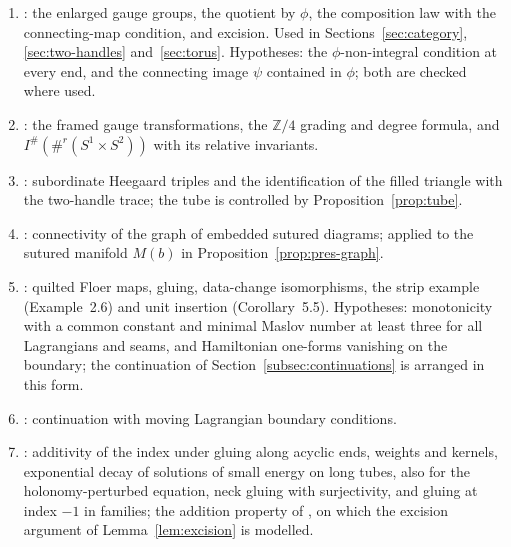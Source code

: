 \documentclass[11pt]{amsart}
\theoremstyle{definition}
\theoremstyle{remark}
\theoremstyle{plain}
\numberwithin{equation}{section}
\newcommand{\ZZ}{\mathbb{Z}}
\newcommand{\Ish}{I^{\#}}
\begin{document}
\begin{enumerate}[label=(\arabic*),leftmargin=2em]
  singularities for the mixed equation.
  Hypotheses: fixed product collars after conformal rescaling; the
  disconnected odd matching surface is allowed.
\item \cite[Sections~5.1--5.2, Definition~5.1, Propositions~5.2
  and~5.4, Theorem~5.6]{KM-unknot}: the enlarged gauge groups, the
  quotient by $\phi$, the composition law with the connecting-map
  condition, and excision. Used in Sections~\ref{sec:category},
  \ref{sec:two-handles} and~\ref{sec:torus}. Hypotheses: the
  $\phi$-non-integral condition at every end, and the connecting image
  $\psi$ contained in $\phi$; both are checked where used.
\item \cite[Sections~7.1--7.4, 7.6--7.8, Proposition~7.1]{Scaduto}: the
  framed gauge transformations, the $\ZZ/4$ grading and degree formula,
  and $\Ish(\#^r(S^1\times S^2))$ with its relative invariants.
\item \cite[Definition~4.2, Proposition~4.3, Lemma~4.5]{OS-triangles}:
  subordinate Heegaard triples and the identification of the filled
  triangle with the two-handle trace; the tube is controlled by
  Proposition~\ref{prop:tube}.
\item \cite[Definitions~2.34--2.35, Proposition~2.36]{JTZ}: connectivity of the
  graph of embedded sutured diagrams; applied to the sutured manifold
  $M(b)$ in Proposition~\ref{prop:pres-graph}.
\item \cite[Theorems~3.9, 3.13, 4.1, 4.2, Example~2.6 and Corollary~5.5]{WW-relative}:
  quilted Floer maps, gluing, data-change isomorphisms, the strip example
  (Example~2.6) and unit insertion (Corollary~5.5). Hypotheses: monotonicity with a common constant and minimal
  Maslov number at least three for all Lagrangians and seams, and
  Hamiltonian one-forms vanishing on the boundary; the continuation of
  Section~\ref{subsec:continuations} is arranged in this form.
\item \cite[Section~14.4]{Oh-book}: continuation with moving Lagrangian
  boundary conditions.
\item \cite[Propositions~3.8--3.10, 4.3, 4.4 and~4.16, Theorems~4.17 and~5.4,
  Sections~5.3 and~5.5]{Donaldson-book}: additivity of the index under gluing along
  acyclic ends, weights and kernels, exponential decay of solutions of small energy
  on long tubes, also for the holonomy-perturbed equation, neck gluing with
  surjectivity, and gluing at index $-1$ in families;
  the addition property of \cite[Section~3.3]{Donaldson-book}, on which the excision argument of Lemma~\ref{lem:excision} is modelled.

\end{enumerate}
\end{document}
